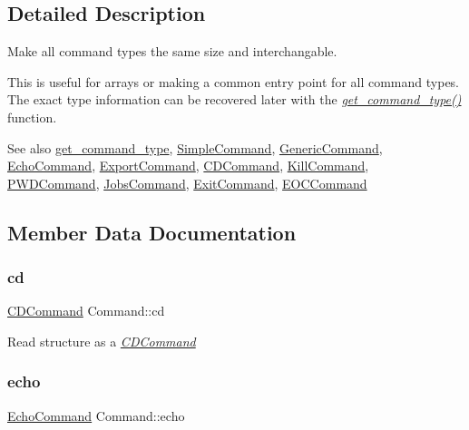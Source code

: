 \subsection{Detailed Description}
Make all command types the same size and interchangable. 

This is useful for arrays or making a common entry point for all command types. The exact type information can be recovered later with the {\itshape \hyperlink{command_8c_a1708aa65874060aa7ef99bf9e1671f5c}{get\+\_\+command\+\_\+type()}} function.

\begin{DoxySeeAlso}{See also}
\hyperlink{command_8h_a1708aa65874060aa7ef99bf9e1671f5c}{get\+\_\+command\+\_\+type}, \hyperlink{structSimpleCommand}{Simple\+Command}, \hyperlink{structGenericCommand}{Generic\+Command}, \hyperlink{command_8h_a8dc22d719c880c1ffcd9bc2dc5773633}{Echo\+Command}, \hyperlink{structExportCommand}{Export\+Command}, \hyperlink{structCDCommand}{C\+D\+Command}, \hyperlink{structKillCommand}{Kill\+Command}, \hyperlink{command_8h_a0c0e44e3e2b07b1e9b48023205cb4ca2}{P\+W\+D\+Command}, \hyperlink{command_8h_a027de4ed5fe4b0313c6c8ee0c2c1806b}{Jobs\+Command}, \hyperlink{command_8h_a354cb87bc40859e5595de56b675732bc}{Exit\+Command}, \hyperlink{command_8h_ae5bf5cf7a34428c221f28179034dd125}{E\+O\+C\+Command} 
\end{DoxySeeAlso}


\subsection{Member Data Documentation}
\mbox{\label{unionCommand_a488c8f6e6ce10f7c9126f37c5f37776d}} 
\subsubsection{\texorpdfstring{cd}{cd}}
{\footnotesize\ttfamily \hyperlink{structCDCommand}{C\+D\+Command} Command\+::cd}

Read structure as a {\itshape \hyperlink{structCDCommand}{C\+D\+Command}} \mbox{\label{unionCommand_a74de4769cc35dac9a3f7dfd24cb87ad7}} 
\subsubsection{\texorpdfstring{echo}{echo}}
{\footnotesize\ttfamily \hyperlink{command_8h_a8dc22d719c880c1ffcd9bc2dc5773633}{Echo\+Command} Command\+::echo}

